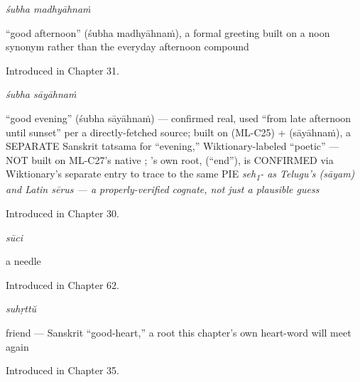 \noindent\begin{minipage}[t]{\linewidth}
\raggedright
\textbf{ }\enspace\emph{śubha madhyāhnaṁ}\par
\small \textquotedblleft{}good afternoon\textquotedblright{} (śubha madhyāhnaṁ), a formal greeting built on a noon synonym rather than the everyday afternoon compound\par
\footnotesize Introduced in Chapter 31.
\end{minipage}\par\medskip

\noindent\begin{minipage}[t]{\linewidth}
\raggedright
\textbf{ }\enspace\emph{śubha sāyāhnaṁ}\par
\small \textquotedblleft{}good evening\textquotedblright{} (śubha sāyāhnaṁ) — confirmed real, used \textquotedblleft{}from late afternoon until sunset\textquotedblright{} per a directly-fetched source; built on  (ML-C25) +  (sāyāhnaṁ), a SEPARATE Sanskrit tatsama for \textquotedblleft{}evening,\textquotedblright{} Wiktionary-labeled \textquotedblleft{}poetic\textquotedblright{} — NOT built on ML-C27's native ; 's own root,  (\textquotedblleft{}end\textquotedblright{}), is CONFIRMED via Wiktionary's separate  entry to trace to the same PIE \emph{seh\textsubscript{1}- as Telugu's  (sāyam) and Latin sērus — a properly-verified cognate, not just a plausible guess}\par
\footnotesize Introduced in Chapter 30.
\end{minipage}\par\medskip

\noindent\begin{minipage}[t]{\linewidth}
\raggedright
\textbf{}\enspace\emph{sūci}\par
\small a needle\par
\footnotesize Introduced in Chapter 62.
\end{minipage}\par\medskip

\noindent\begin{minipage}[t]{\linewidth}
\raggedright
\textbf{}\enspace\emph{suhṛttŭ}\par
\small friend — Sanskrit \textquotedblleft{}good-heart,\textquotedblright{} a root this chapter's own heart-word will meet again\par
\footnotesize Introduced in Chapter 35.
\end{minipage}\par\medskip

